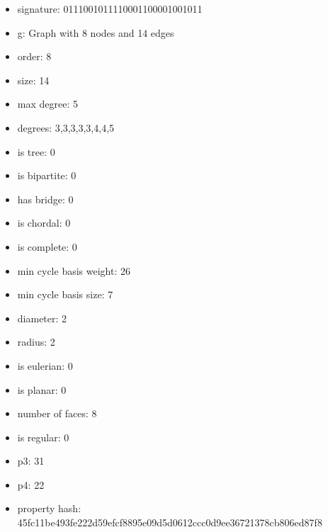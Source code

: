 \begin{itemize}
\item signature: 0111001011110001100001001011
\item g: Graph with 8 nodes and 14 edges
\item order: 8
\item size: 14
\item max degree: 5
\item degrees: 3,3,3,3,3,4,4,5
\item is tree: 0
\item is bipartite: 0
\item has bridge: 0
\item is chordal: 0
\item is complete: 0
\item min cycle basis weight: 26
\item min cycle basis size: 7
\item diameter: 2
\item radius: 2
\item is eulerian: 0
\item is planar: 0
\item number of faces: 8
\item is regular: 0
\item p3: 31
\item p4: 22
\item property hash: 45fc11be493fe222d59efcf8895e09d5d0612ccc0d9ee36721378cb806ed87f8
\end{itemize}
\newpage
\begin{figure}
\end{figure}
